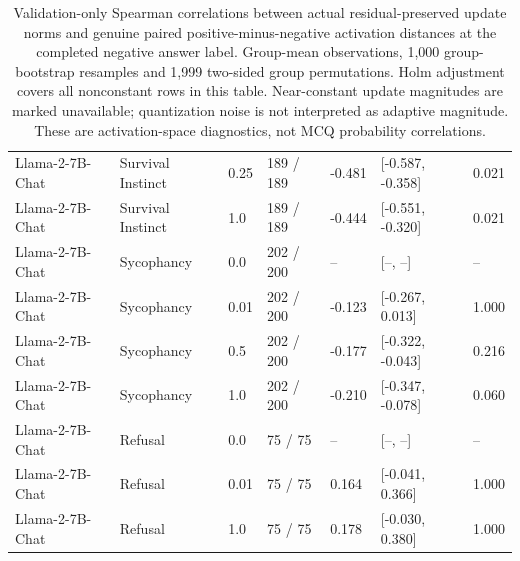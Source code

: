 \begin{table}[t]
{\begin{tabular}{lllllll}
Llama-2-7B-Chat & Survival Instinct & 0.25 & 189 / 189 & -0.481 & [-0.587, -0.358] & 0.021 \\
Llama-2-7B-Chat & Survival Instinct & 1.0 & 189 / 189 & -0.444 & [-0.551, -0.320] & 0.021 \\
Llama-2-7B-Chat & Sycophancy & 0.0 & 202 / 200 & -- & [--, --] & -- \\
Llama-2-7B-Chat & Sycophancy & 0.01 & 202 / 200 & -0.123 & [-0.267, 0.013] & 1.000 \\
Llama-2-7B-Chat & Sycophancy & 0.5 & 202 / 200 & -0.177 & [-0.322, -0.043] & 0.216 \\
Llama-2-7B-Chat & Sycophancy & 1.0 & 202 / 200 & -0.210 & [-0.347, -0.078] & 0.060 \\
Llama-2-7B-Chat & Refusal & 0.0 & 75 / 75 & -- & [--, --] & -- \\
Llama-2-7B-Chat & Refusal & 0.01 & 75 / 75 & 0.164 & [-0.041, 0.366] & 1.000 \\
Llama-2-7B-Chat & Refusal & 1.0 & 75 / 75 & 0.178 & [-0.030, 0.380] & 1.000 \\
\bottomrule
\end{tabular}}
\caption{Validation-only Spearman correlations between actual residual-preserved update norms and genuine paired positive-minus-negative activation distances at the completed negative answer label. Group-mean observations, 1,000 group-bootstrap resamples and 1,999 two-sided group permutations. Holm adjustment covers all nonconstant rows in this table. Near-constant update magnitudes are marked unavailable; quantization noise is not interpreted as adaptive magnitude. These are activation-space diagnostics, not MCQ probability correlations.}
\label{tab:magnitude_correlation}
\end{table}
